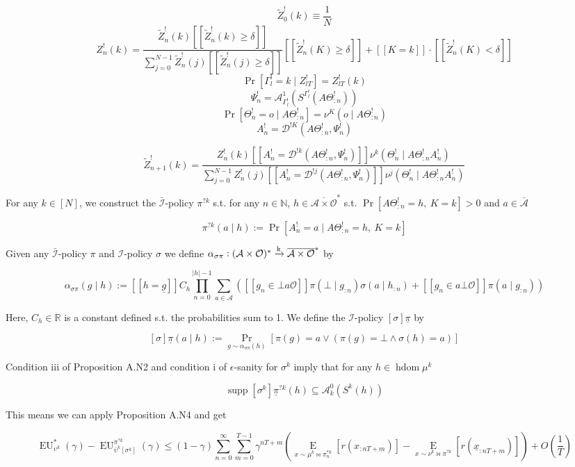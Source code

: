 \documentclass[a4paper]{article}
\DeclareMathOperator{\Supp}{supp}
\newcommand{\E}[1]{\underset{#1}{\operatorname{E}}}
\newcommand{\Nats}{\mathbb{N}}
\newcommand{\Reals}{\mathbb{R}}
\newcommand{\Abs}[1]{\lvert #1 \rvert}
\newcommand{\M}{\xrightarrow{\textnormal{k}}}
\newcommand{\Ob}{\mathcal{O}}
\newcommand{\A}{\mathcal{A}}
\newcommand{\In}{\mathcal{I}}
\newcommand{\FH}{(\A \times \Ob)^*}
\newcommand{\Ada}{\bar{\A}}
\newcommand{\Adi}{{\bar{\In}}}
\newcommand{\Adao}{\overline{\A \times \Ob}}
\newcommand{\Adfh}{\Adao^*}
\DeclareMathOperator{\HD}{hdom}
\newcommand{\EU}{\operatorname{EU}}
\newcommand{\D}{\mathcal{D}}
\newcommand{\Z}{Z}
\begin{document}
$$\tilde{\Z}^!_0(k)\equiv\frac{1}{N}$$
%
$$\Z_{n}^!(k) = \frac{\tilde{\Z}^!_{n}(k)[[\tilde{\Z}^!_{n}(k) \geq \delta]] }{\sum_{j = 0}^{N-1}\tilde{\Z}^!_{n}(j)[[\tilde{\Z}^!_{n}(j) \geq \delta]]}[[\tilde{\Z}^!_{n}(K) \geq \delta]] + [[K = k]]\cdot [[\tilde{\Z}^!_{n}(K) < \delta]]$$
%
$$\Pr\left[\Gamma^!_{l} = k \mid Z^!_{lT}\right] = \Z^!_{lT}\left(k\right)$$
%
$$\Psi^!_{n} = \A^1_{\Gamma^!_l}\left(S^{\Gamma^!_l}(A\Theta^!_{:n})\right)$$
%
$$\Pr\left[\Theta^!_{n} = o \mid A\Theta^!_{:n}\right] = \nu^K\left(o \mid A\Theta^!_{:n}\right)$$
%
$$A^!_n = \D^{!K}\left(A\Theta^!_{:n}, \Psi^!_n\right)$$

$$\tilde{\Z}^!_{n+1}(k)=\frac{\Z^!_{n}(k) [[A^!_n = \D^{!k}\left(A\Theta^!_{:n}, \Psi^!_n\right)]] \nu^k\left(\Theta^!_{n} \mid A\Theta^!_{:n}A^!_{n}\right)}{\sum_{j = 0}^{N-1} \Z^!_n(j) [[A^!_n = \D^{!j}\left(A\Theta^!_{:n}, \Psi^!_n\right)]] \nu^j(\Theta^!_n \mid A\Theta^!_{:n}A^!_n)}$$

For any $k \in [N]$, we construct the $\Adi$-policy $\pi^{?k}$ s.t. for any $n \in \Nats$, $h \in \Adfh$ s.t. $\Pr\left[A\Theta^!_{:n}=h,\ K = k\right] > 0$ and $a \in \Ada$

$$\pi^{?k}(a \mid h):=\Pr\left[A^!_n = a \mid A\Theta^!_{:n} = h,\ K = k\right]$$

Given any $\Adi$-policy $\pi$ and $\In$-policy $\sigma$ we define $\alpha_{\sigma\pi}: \FH \M \Adfh$ by

$$\alpha_{\sigma\pi} (g \mid h) := [[h = \underline{g}]]C_h\prod_{n = 0}^{\Abs{h}-1} \sum_{a \in \A}\left([[g_n \in \bot a\Ob]] \pi\left(\bot \mid g_{:n}\right)\sigma\left(a \mid h_{:n}\right)+[[g_n \in a\bot\Ob]]\pi\left(a \mid g_{:n}\right)\right)$$

Here, $C_h \in \Reals$ is a constant defined s.t. the probabilities sum to 1. We define the $\In$-policy $\left[\sigma\right]\underline{\pi}$ by

$$\left[\sigma\right]\underline{\pi}(a \mid h):=\Pr_{g \sim \alpha_{\sigma\pi}(h)}\left[\pi\left(g\right)=a \lor \left(\pi\left(g\right)=\bot \land \sigma(h)=a\right)\right]$$

Condition iii of Proposition A.N2 and condition i of $\epsilon$-sanity for $\sigma^k$ imply that for any $h \in \HD{\mu^k}$

$$\Supp{\left[\sigma^k\right]\underline{\pi}^{?k}(h)} \subseteq \A^0_k\left(S^k\left(h\right)\right)$$

This means we can apply Proposition A.N4 and get

$$\EU^*_{\upsilon^k}(\gamma)-\EU^{\pi^{?k}}_{\bar{\upsilon}^k[\sigma^k]}(\gamma) \leq (1-\gamma)\sum_{n=0}^\infty \sum_{m=0}^{T-1} \gamma^{nT+m}\left(\E{x\sim\mu^k\bowtie\pi^{*k}_n}\left[r\left(x_{:nT+m}\right)\right]-\E{x\sim\nu^k\bowtie\pi^{?k}}\left[r\left(\underline{x}_{:nT+m}\right)\right]\right) + O\left(\frac{1}{T}\right)$$
\end{document}
